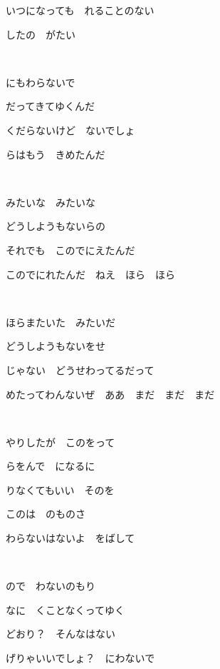 \documentclass[12pt,a4paper]{article}
\begin{document}
いつになっても　れることのない

したの　がたい

~

にもわらないで

だってきてゆくんだ

くだらないけど　ないでしょ

らはもう　きめたんだ

~

みたいな　みたいな

どうしようもないらの

それでも　このでにえたんだ

このでにれたんだ　ねえ　ほら　ほら

~

ほらまたいた　みたいだ

どうしようもないをせ

じゃない　どうせわってるだって

めたってわんないぜ　ああ　まだ　まだ　まだ

~

やりしたが　このをって

らをんで　になるに

りなくてもいい　そのを

このは　のものさ

わらないはないよ　をばして

~

ので　わないのもり

なに　くことなくってゆく

どおり？　そんなはない

げりゃいいでしょ？　にわないで
\end{document}

